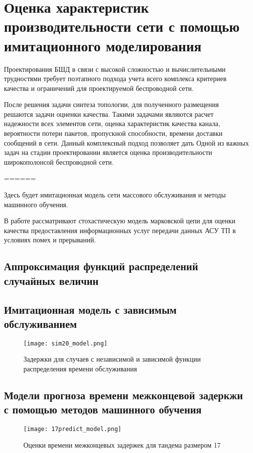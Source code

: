 \chapter{Оценка характеристик производительности сети с помощью имитационного моделирования}\label{prediction_model}

Проектирования БШД в связи с высокой сложностью и вычислительными трудностями требует поэтапного подхода учета всего комплекса критериев качества и ограничений для проектируемой беспроводной сети.

После решения задачи синтеза топологии, для полученного размещения решаются задачи оцненки качества. Такими задачами являются расчет надежности всех элементов сети, оценка характеристик качества канала, вероятности потери пакетов, пропускной способности, времени доставки сообщений в сети. Данный комплексный подход позволяет дать  
Одной из важных задач на стадии проектировании является оценка производительности широкополонсой беспроводной сети. 

======

\cite{Tcharo2018} 

Здесь будет имитационная модель сети массового обслуживания и методы машинного обучения.


В работе \cite{Eremenko2013} рассматривают стохастическую модель марковской цепи для оценки качества предоставления информационных услуг передачи данных АСУ ТП в условиях помех и прерываний.

\section{Аппроксимация функций распределений случайных величин}
\section{Имитационная модель с зависимым обслуживанием}
\begin{figure}[h!]
  \centering
   \texttt{[image: sim20\_model.png]}
\caption{Задержки для случаев с независимой и зависимой функции распределения времени обслуживания}
\label{fig:sim20_model}
\end{figure}

\section{Модели прогноза времени межконцевой задеркжи с помощью методов машинного обучения}
\begin{figure}[h!]
    \centering
     \texttt{[image: 17predict\_model.png]}
  \caption{Оценки времени межконцевых задержек для тандема размером 17}
  \label{fig:17predict_model}
\end{figure}

